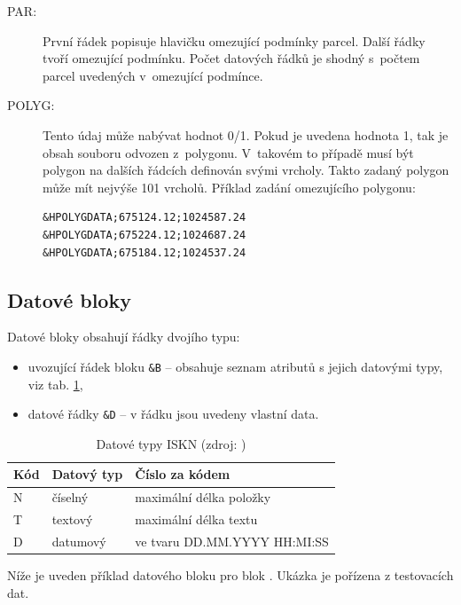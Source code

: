 \documentclass[a4paper,12pt,oneside]{book}
\begin{document}
\begin{description}
 \item[PAR:] První řádek popisuje hlavičku omezující podmínky parcel. Další řádky tvoří omezující podmínku. Počet datových řádků je shodný s~počtem parcel uvedených v~omezující podmínce.
 
 \item[POLYG:] Tento údaj může nabývat hodnot 0/1. Pokud je uvedena hodnota 1, tak je obsah souboru odvozen z~polygonu. V~takovém to případě musí být polygon na dalších řádcích definován svými vrcholy. Takto zadaný polygon může mít nejvýše 101 vrcholů. Příklad zadání omezujícího polygonu:
 
 \begin{lstlisting}
&HPOLYGDATA;675124.12;1024587.24
&HPOLYGDATA;675224.12;1024687.24
&HPOLYGDATA;675184.12;1024537.24
 \end{lstlisting} 
\end{description}

\subsection{Datové bloky}

Datové bloky obsahují řádky dvojího typu:

\begin{itemize}
 \item uvozující řádek bloku \texttt{\&B} -- obsahuje seznam atributů s jejich datovými typy, viz tab. \ref{t_datove_typy},
 \item datové řádky \texttt{\&D} -- v řádku jsou uvedeny vlastní data.
\end{itemize}

\begin{table}[htbp]
\centering
\caption[Datové typy ISKN]{Datové typy ISKN (zdroj: \cite{dp_landa})}
\begin{tabular}{lll}
\toprule
\textbf{Kód} & \textbf{Datový typ} & \textbf{Číslo za kódem} \\ 
\midrule
N & číselný & maximální délka položky \\ 
T & textový & maximální délka textu \\ 
D & datumový & ve tvaru DD.MM.YYYY HH:MI:SS \\ 
\bottomrule
\end{tabular}
\label{t_datove_typy}
\end{table}

Níže je uveden příklad datového bloku pro blok . Ukázka je pořízena z testovacích dat.
\end{document}
